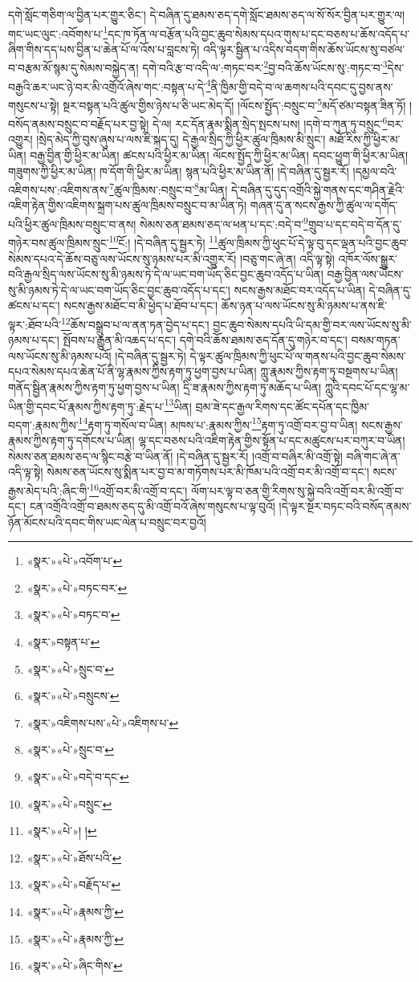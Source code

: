 དགེ་སློང་གཅིག་ལ་བྱིན་པར་གྱུར་ཅིང་། དེ་བཞིན་དུ་ཐམས་ཅད་དགེ་སློང་ཐམས་ཅད་ལ་སོ་སོར་བྱིན་པར་གྱུར་ལ། གང་ཡང་ལུང་:འབོགས་པ་\footnote{«སྣར་»«པེ་»འབོག་པ་}དང་ཁ་ཏོན་ལ་བརྩོན་པའི་བྱང་ཆུབ་སེམས་དཔའ་གུས་པ་དང་བཅས་པ་ཆོས་འདོད་པ་ཞིག་གིས་དད་པས་བྱིན་པ་ཆེན་པོ་ལ་འོས་པ་བླངས་ཏེ། འདི་ལྟར་སྦྱིན་པ་འདིས་བདག་གིས་ཆོས་ཡོངས་སུ་བཙལ་བ་བརྩམ་མོ་སྙམ་དུ་སེམས་བསྐྱེད་ན། དགེ་བའི་རྩ་བ་འདི་ལ་:གཏང་བར་\footnote{«སྣར་»«པེ་»བཏང་བར་}བྱ་བའི་ཆོས་ཡོངས་སུ་:གཏང་བ་\footnote{«སྣར་»«པེ་»བཏང་བ་}དེས་བརྒྱའི་ཆར་ཡང་ཉེ་བར་མི་འགྲོའོ་ཞེས་གང་:བསྟན་པ་དེ་\footnote{«སྣར་»བསྟན་པ་}ནི་ཁྱིམ་གྱི་བདེ་བ་ལ་ཆགས་པའི་དབང་དུ་བྱས་ནས་གསུངས་པ་སྟེ། སྔར་བསྟན་པའི་ཚུལ་གྱིས་ཉེས་པ་ཅི་ཡང་མེད་དོ། །ལོངས་སྤྱོད་:བསྲུང་བ་\footnote{«སྣར་»«པེ་»སྲུང་བ་}མདོ་ཙམ་བསྟན་ཟིན་ཏོ། །བསོད་ནམས་བསྲུང་བ་བརྗོད་པར་བྱ་སྟེ། དེ་ལ། རང་དོན་རྣམ་སྨིན་སྲེད་སྤངས་པས། །དགེ་བ་ཀུན་ཏུ་བསྲུང་\footnote{«སྣར་»«པེ་»བསྲུངས་}བར་འགྱུར། །སྲེད་མེད་ཀྱི་བུས་ཞུས་པ་ལས་ཇི་སྐད་དུ། དེ་རྒྱལ་སྲིད་ཀྱི་ཕྱིར་ཚུལ་ཁྲིམས་མི་སྲུང་། མཐོ་རིས་ཀྱི་ཕྱིར་མ་ཡིན། བརྒྱ་བྱིན་གྱི་ཕྱིར་མ་ཡིན། ཚངས་པའི་ཕྱིར་མ་ཡིན། ལོངས་སྤྱོད་ཀྱི་ཕྱིར་མ་ཡིན། དབང་ཕྱུག་གི་ཕྱིར་མ་ཡིན། གཟུགས་ཀྱི་ཕྱིར་མ་ཡིན། ཁ་དོག་གི་ཕྱིར་མ་ཡིན། སྙན་པའི་ཕྱིར་མ་ཡིན་ནོ། །དེ་བཞིན་དུ་སྦྱར་རོ། །དམྱལ་བའི་འཇིགས་པས་:འཇིགས་ནས་\footnote{«སྣར་»འཇིགས་པས་«པེ་»འཇིགས་པ་}ཚུལ་ཁྲིམས་:བསྲུང་བ་\footnote{«སྣར་»«པེ་»སྲུང་བ་}མ་ཡིན། དེ་བཞིན་དུ་དུད་འགྲོའི་སྐྱེ་གནས་དང་གཤིན་རྗེའི་འཇིག་རྟེན་གྱིས་འཇིགས་སྐྲག་པས་ཚུལ་ཁྲིམས་བསྲུང་བ་མ་ཡིན་ཏེ། གཞན་དུ་ན་སངས་རྒྱས་ཀྱི་ཚུལ་ལ་དགོད་པའི་ཕྱིར་ཚུལ་ཁྲིམས་བསྲུང་བ་ནས། སེམས་ཅན་ཐམས་ཅད་ལ་ཕན་པ་དང་:བདེ་བ་\footnote{«སྣར་»«པེ་»བདེ་བ་དང་}གྲུབ་པ་དང་བདེ་བ་དོན་དུ་གཉེར་བས་ཚུལ་ཁྲིམས་སྲུང་\footnote{«སྣར་»«པེ་»བསྲུང་}ངོ:། །དེ་བཞིན་དུ་སྦྱར་ཏེ། \footnote{«སྣར་»«པེ་»། ། }ཚུལ་ཁྲིམས་ཀྱི་ཕུང་པོ་དེ་ལྟ་བུ་དང་ལྡན་པའི་བྱང་ཆུབ་སེམས་དཔའ་དེ་ཆོས་བཅུ་ལས་ཡོངས་སུ་ཉམས་པར་མི་འགྱུར་རོ། །བཅུ་གང་ཞེ་ན། འདི་ལྟ་སྟེ། འཁོར་ལོས་སྒྱུར་བའི་རྒྱལ་སྲིད་ལས་ཡོངས་སུ་མི་ཉམས་ཏེ་དེ་ལ་ཡང་བག་ཡོད་ཅིང་བྱང་ཆུབ་འདོད་པ་ཡིན། བརྒྱ་བྱིན་ལས་ཡོངས་སུ་མི་ཉམས་ཏེ་དེ་ལ་ཡང་བག་ཡོད་ཅིང་བྱང་ཆུབ་འདོད་པ་དང་། སངས་རྒྱས་མཐོང་བར་འདོད་པ་ཡིན། དེ་བཞིན་དུ་ཚངས་པ་དང་། སངས་རྒྱས་མཐོང་བ་མི་ཕྱེད་པ་ཐོབ་པ་དང་། ཆོས་ཉན་པ་ལས་ཡོངས་སུ་མི་ཉམས་པ་ནས་ཇི་ལྟར་:ཐོབ་པའི་\footnote{«སྣར་»«པེ་»ཐོས་པའི་}ཆོས་བསྒྲུབ་པ་ལ་ནན་ཏན་བྱེད་པ་དང་། བྱང་ཆུབ་སེམས་དཔའི་ཡི་དམ་གྱི་བར་ལས་ཡོངས་སུ་མི་ཉམས་པ་དང་། སྤོབས་པ་རྒྱུན་མི་འཆད་པ་དང་། དགེ་བའི་ཆོས་ཐམས་ཅད་དོན་དུ་གཉེར་བ་དང་། བསམ་གཏན་ལས་ཡོངས་སུ་མི་ཉམས་པའོ། །དེ་བཞིན་དུ་སྦྱར་ཏེ། དེ་ལྟར་ཚུལ་ཁྲིམས་ཀྱི་ཕུང་པོ་ལ་གནས་པའི་བྱང་ཆུབ་སེམས་དཔའ་སེམས་དཔའ་ཆེན་པོ་ནི་ལྷ་རྣམས་ཀྱིས་རྟག་ཏུ་ཕྱག་བྱས་པ་ཡིན། ཀླུ་རྣམས་ཀྱིས་རྟག་ཏུ་བསྔགས་པ་ཡིན། གནོད་སྦྱིན་རྣམས་ཀྱིས་རྟག་ཏུ་ཕྱག་བྱས་པ་ཡིན། དྲི་ཟ་རྣམས་ཀྱིས་རྟག་ཏུ་མཆོད་པ་ཡིན། ཀླུའི་དབང་པོ་དང་ལྷ་མ་ཡིན་གྱི་དབང་པོ་རྣམས་ཀྱིས་རྟག་ཏུ་:རྗེད་པ་\footnote{«སྣར་»«པེ་»བརྗོད་པ་}ཡིན། བྲམ་ཟེ་དང་རྒྱལ་རིགས་དང་ཚོང་དཔོན་དང་ཁྱིམ་བདག་:རྣམས་ཀྱིས་\footnote{«སྣར་»«པེ་»རྣམས་ཀྱི་}རྟག་ཏུ་གསོལ་བ་ཡིན། མཁས་པ་:རྣམས་ཀྱིས་\footnote{«སྣར་»«པེ་»རྣམས་ཀྱི་}རྟག་ཏུ་འགྲོ་བར་བྱ་བ་ཡིན། སངས་རྒྱས་རྣམས་ཀྱིས་རྟག་ཏུ་དགོངས་པ་ཡིན། ལྷ་དང་བཅས་པའི་འཇིག་རྟེན་གྱིས་སྟོན་པ་དང་མཚུངས་པར་བཀུར་བ་ཡིན། སེམས་ཅན་ཐམས་ཅད་ལ་སྙིང་བརྩེ་བ་ཡིན་ནོ། །དེ་བཞིན་དུ་སྦྱར་རོ། །འགྲོ་བ་བཞིར་མི་འགྲོ་སྟེ། བཞི་གང་ཞེ་ན་འདི་ལྟ་སྟེ། སེམས་ཅན་ཡོངས་སུ་སྨིན་པར་བྱ་བ་མ་གཏོགས་པར་མི་ཁོམ་པའི་འགྲོ་བར་མི་འགྲོ་བ་དང་། སངས་རྒྱས་མེད་པའི་:ཞིང་གི་\footnote{«སྣར་»«པེ་»ཞིང་གིས་}འགྲོ་བར་མི་འགྲོ་བ་དང་། ལོག་པར་ལྟ་བ་ཅན་གྱི་རིགས་སུ་སྐྱེ་བའི་འགྲོ་བར་མི་འགྲོ་བ་དང་། ངན་འགྲོའི་འགྲོ་བ་ཐམས་ཅད་དུ་མི་འགྲོ་བའོ་ཞེས་གསུངས་པ་ལྟ་བུའོ། །དེ་ལྟར་སྔར་བཏང་བའི་བསོད་ནམས་ཉོན་མོངས་པའི་དབང་གིས་ཡང་ལེན་པ་བསྲུང་བར་བྱའོ། 